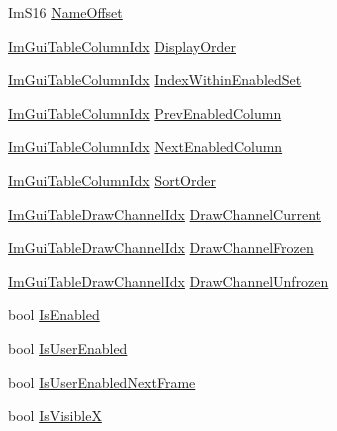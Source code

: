\begin{DoxyCompactItemize}
\item 
Im\+S16 \hyperlink{structImGuiTableColumn_a533be5aba6d7965ffe6d39afaf189e26}{Name\+Offset}
\item 
\hyperlink{imgui__internal_8h_abe1882c8292cd23a77a54eda2407f147}{Im\+Gui\+Table\+Column\+Idx} \hyperlink{structImGuiTableColumn_a30b397fb788df97b1cf85242a173c31e}{Display\+Order}
\item 
\hyperlink{imgui__internal_8h_abe1882c8292cd23a77a54eda2407f147}{Im\+Gui\+Table\+Column\+Idx} \hyperlink{structImGuiTableColumn_a6a17282517d23f9e7966e86647f4944b}{Index\+Within\+Enabled\+Set}
\item 
\hyperlink{imgui__internal_8h_abe1882c8292cd23a77a54eda2407f147}{Im\+Gui\+Table\+Column\+Idx} \hyperlink{structImGuiTableColumn_a335b58f6a43d6e776327d6a3a4a5f237}{Prev\+Enabled\+Column}
\item 
\hyperlink{imgui__internal_8h_abe1882c8292cd23a77a54eda2407f147}{Im\+Gui\+Table\+Column\+Idx} \hyperlink{structImGuiTableColumn_a716d0d38ad604f8434626cce11e535f3}{Next\+Enabled\+Column}
\item 
\hyperlink{imgui__internal_8h_abe1882c8292cd23a77a54eda2407f147}{Im\+Gui\+Table\+Column\+Idx} \hyperlink{structImGuiTableColumn_ae068aee2c3b454f733a2c1cd5d89ff9b}{Sort\+Order}
\item 
\hyperlink{imgui__internal_8h_aad84cfe70f5c1afb2c057b0284cbed03}{Im\+Gui\+Table\+Draw\+Channel\+Idx} \hyperlink{structImGuiTableColumn_ad7dbb4e750b7664b40742bb56250d64b}{Draw\+Channel\+Current}
\item 
\hyperlink{imgui__internal_8h_aad84cfe70f5c1afb2c057b0284cbed03}{Im\+Gui\+Table\+Draw\+Channel\+Idx} \hyperlink{structImGuiTableColumn_a59c15fb68259b05b9a6fcea792e5366b}{Draw\+Channel\+Frozen}
\item 
\hyperlink{imgui__internal_8h_aad84cfe70f5c1afb2c057b0284cbed03}{Im\+Gui\+Table\+Draw\+Channel\+Idx} \hyperlink{structImGuiTableColumn_a5092f8954b431b15748dfcd6a6338f8b}{Draw\+Channel\+Unfrozen}
\item 
bool \hyperlink{structImGuiTableColumn_ab4b7e8d917934686b0cb30304aa12c4b}{Is\+Enabled}
\item 
bool \hyperlink{structImGuiTableColumn_a0e71a32a995e7e68b50cd88eb93e2098}{Is\+User\+Enabled}
\item 
bool \hyperlink{structImGuiTableColumn_a077efdc7e4bc41077533f4a6c83621a8}{Is\+User\+Enabled\+Next\+Frame}
\item 
bool \hyperlink{structImGuiTableColumn_aedf1340d3ad8ecce3ce153b8c2e35ba9}{Is\+VisibleX}
\item 

\end{DoxyCompactItemize}
